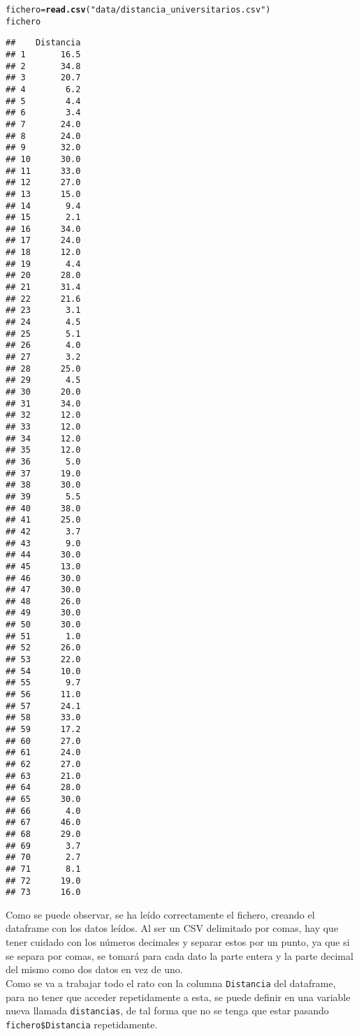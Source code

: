 \documentclass[12pt]{report}\usepackage[]{graphicx}\usepackage[dvipsnames]{xcolor}
\makeatletter
\newcommand{\hlstr}[1]{\textcolor[rgb]{0.192,0.494,0.8}{#1}}%
\newcommand{\hlstd}[1]{\textcolor[rgb]{0.345,0.345,0.345}{#1}}%
\newcommand{\hlkwb}[1]{\textcolor[rgb]{0.69,0.353,0.396}{#1}}%
\newcommand{\hlkwd}[1]{\textcolor[rgb]{0.737,0.353,0.396}{\textbf{#1}}}%
\newenvironment{kframe}{%
 \def\at@end@of@kframe{}%
 \ifinner\ifhmode%
  \def\at@end@of@kframe{\end{minipage}}%
  \begin{minipage}{\columnwidth}%
 \fi\fi%
 \def\FrameCommand##1{\hskip\@totalleftmargin \hskip-\fboxsep
 \colorbox{shadecolor}{##1}\hskip-\fboxsep
     \hskip-\linewidth \hskip-\@totalleftmargin \hskip\columnwidth}%
 \MakeFramed {\advance\hsize-\width
   \@totalleftmargin\z@ \linewidth\hsize
   \@setminipage}}%
 {\par\unskip\endMakeFramed%
 \at@end@of@kframe}
\newenvironment{knitrout}{}{} %
\makeatother
\begin{document}
\begin{knitrout}
\color{fgcolor}\begin{kframe}
\begin{alltt}
\hlstd{fichero} \hlkwb{=} \hlkwd{read.csv}\hlstd{(}\hlstr{"data/distancia_universitarios.csv"}\hlstd{)}
\hlstd{fichero}
\end{alltt}
\begin{verbatim}
##    Distancia
## 1       16.5
## 2       34.8
## 3       20.7
## 4        6.2
## 5        4.4
## 6        3.4
## 7       24.0
## 8       24.0
## 9       32.0
## 10      30.0
## 11      33.0
## 12      27.0
## 13      15.0
## 14       9.4
## 15       2.1
## 16      34.0
## 17      24.0
## 18      12.0
## 19       4.4
## 20      28.0
## 21      31.4
## 22      21.6
## 23       3.1
## 24       4.5
## 25       5.1
## 26       4.0
## 27       3.2
## 28      25.0
## 29       4.5
## 30      20.0
## 31      34.0
## 32      12.0
## 33      12.0
## 34      12.0
## 35      12.0
## 36       5.0
## 37      19.0
## 38      30.0
## 39       5.5
## 40      38.0
## 41      25.0
## 42       3.7
## 43       9.0
## 44      30.0
## 45      13.0
## 46      30.0
## 47      30.0
## 48      26.0
## 49      30.0
## 50      30.0
## 51       1.0
## 52      26.0
## 53      22.0
## 54      10.0
## 55       9.7
## 56      11.0
## 57      24.1
## 58      33.0
## 59      17.2
## 60      27.0
## 61      24.0
## 62      27.0
## 63      21.0
## 64      28.0
## 65      30.0
## 66       4.0
## 67      46.0
## 68      29.0
## 69       3.7
## 70       2.7
## 71       8.1
## 72      19.0
## 73      16.0
\end{verbatim}
\end{kframe}
\end{knitrout}
			
			Como se puede observar, se ha leído correctamente el fichero, creando el dataframe con los datos leídos. Al ser un CSV delimitado por comas, hay que tener cuidado con los números decimales y separar estos por un punto, ya que si se separa por comas, se tomará para cada dato la parte entera y la parte decimal del mismo como dos datos en vez de uno.\\ 
			
			Como se va a trabajar todo el rato con la columna \texttt{Distancia} del dataframe, para no tener que acceder repetidamente a esta, se puede definir en una variable nueva llamada \texttt{distancias}, de tal forma que no se tenga que estar pasando \texttt{fichero\$Distancia} repetidamente.
			
\end{document}
